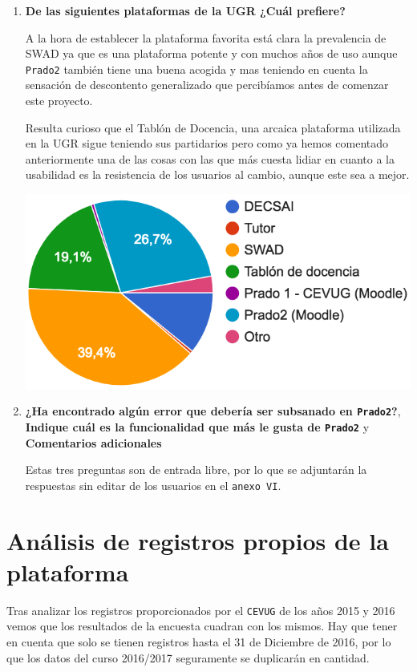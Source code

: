 \begin{enumerate}
  \item \textbf{De las siguientes plataformas de la UGR ¿Cuál prefiere?}

A la hora de establecer la plataforma favorita está clara la prevalencia de SWAD ya que es una plataforma potente y con muchos años de uso aunque \texttt{Prado2} también tiene una buena acogida y mas teniendo en cuenta la sensación de descontento generalizado que percibíamos antes de comenzar este proyecto.

\bigskip
Resulta curioso que el Tablón de Docencia, una arcaica plataforma utilizada en la UGR sigue teniendo sus partidarios pero como ya hemos comentado anteriormente una de las cosas con las que más cuesta lidiar en cuanto a la usabilidad es la resistencia de los usuarios al cambio, aunque este sea a mejor.

\includegraphics[width=1.0\textwidth]{../charts/08_plataformas_prefiere}

  \item \textbf{¿Ha encontrado algún error que debería ser subsanado en \texttt{Prado2}?}, \textbf{Indique cuál es la funcionalidad que más le gusta de \texttt{Prado2}} y \textbf{Comentarios adicionales}

Estas tres preguntas son de entrada libre, por lo que se adjuntarán la respuestas sin editar de los usuarios en el \texttt{anexo VI}.
  
\end{enumerate}


\section{Análisis de registros propios de la plataforma}

Tras analizar los registros proporcionados por el \texttt{CEVUG} de los años 2015 y 2016 vemos que los resultados de la encuesta cuadran con los mismos. Hay que tener en cuenta que solo se tienen registros hasta el 31 de Diciembre de 2016, por lo que los datos del curso 2016/2017 seguramente se duplicarán en cantidad.

